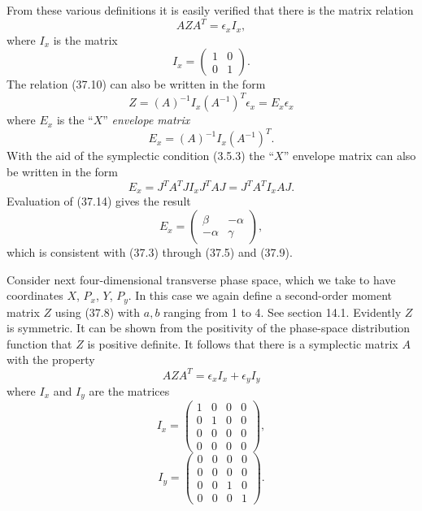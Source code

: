 From these various definitions it is easily verified that there is the matrix relation
\begin{equation}
AZA^T = \epsilon_x I_x,
\end{equation}
where $I_x$ is the matrix
\begin{equation}
I_x = \left( \begin{array}{cc} 1 & 0 \\
0 & 1\end{array}\right).
\end{equation}
The relation (37.10) can also be written in the form
\begin{equation}
Z = (A)^{-1} I_x (A^{-1})^T \epsilon_x = E_x \epsilon_x
\end{equation}
where $E_x$ is the ``$X$'' {\em envelope matrix}
\begin{equation}
E_x = (A)^{-1} I_x (A^{-1})^T.
\end{equation}
With the aid of the symplectic condition (3.5.3) the ``$X$'' envelope matrix can also be written in the form
\begin{equation}
E_x = J^TA^TJI_x J^TAJ = J^TA^TI_xAJ.
\end{equation}
Evaluation of (37.14) gives the result
\begin{equation}
E_x = \left( \begin{array}{cc} \beta & -\alpha \\
-\alpha & \gamma \end{array} \right) ,
\end{equation}
which is consistent with (37.3) through (37.5) and (37.9).

Consider next four-dimensional transverse phase space, which we take to have coordinates $X$, $P_x$, $Y$, $P_y$.  In this case we again define a second-order moment matrix $Z$ using (37.8) with $a,b$ ranging from 1 to 4.  See section 14.1.  Evidently $Z$ is symmetric.  It can be shown from the positivity of the phase-space distribution function that $Z$ is positive definite.  It follows that there is a symplectic matrix $A$ with the property
\begin{equation}
AZA^T = \epsilon_x I_x + \epsilon_y I_y
\end{equation}
where $I_x$ and $I_y$ are the matrices
\begin{equation}
I_x = \left( \begin{array}{cccc} 1 & 0 & 0 & 0 \\
0 & 1 & 0 & 0 \\
0 & 0 & 0 & 0 \\
0 & 0 & 0 & 0\end{array} \right) ,
\end{equation}
\begin{equation}
I_y = \left( \begin{array}{cccc} 0 & 0 & 0 & 0 \\
0 & 0 & 0 & 0 \\
0 & 0 & 1 & 0 \\
0 & 0 & 0 & 1\end{array} \right) .
\end{equation}

